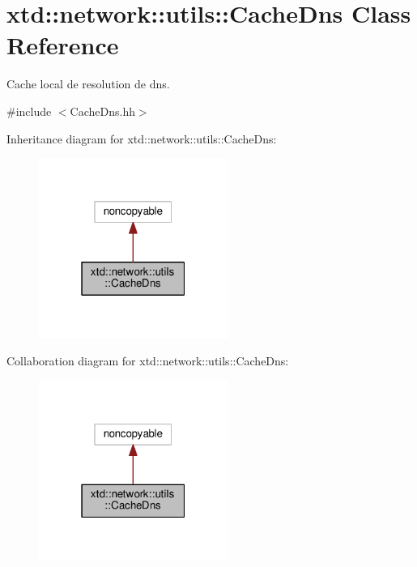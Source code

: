 \hypertarget{classxtd_1_1network_1_1utils_1_1CacheDns}{}\section{xtd\+:\+:network\+:\+:utils\+:\+:Cache\+Dns Class Reference}
\label{classxtd_1_1network_1_1utils_1_1CacheDns}


Cache local de resolution de dns.  




{\ttfamily \#include $<$Cache\+Dns.\+hh$>$}



Inheritance diagram for xtd\+:\+:network\+:\+:utils\+:\+:Cache\+Dns\+:
\nopagebreak
\begin{figure}[H]
\begin{center}
\leavevmode
\includegraphics[width=175pt]{classxtd_1_1network_1_1utils_1_1CacheDns__inherit__graph}
\end{center}
\end{figure}


Collaboration diagram for xtd\+:\+:network\+:\+:utils\+:\+:Cache\+Dns\+:
\nopagebreak
\begin{figure}[H]
\begin{center}
\leavevmode
\includegraphics[width=175pt]{classxtd_1_1network_1_1utils_1_1CacheDns__coll__graph}
\end{center}
\end{figure}
